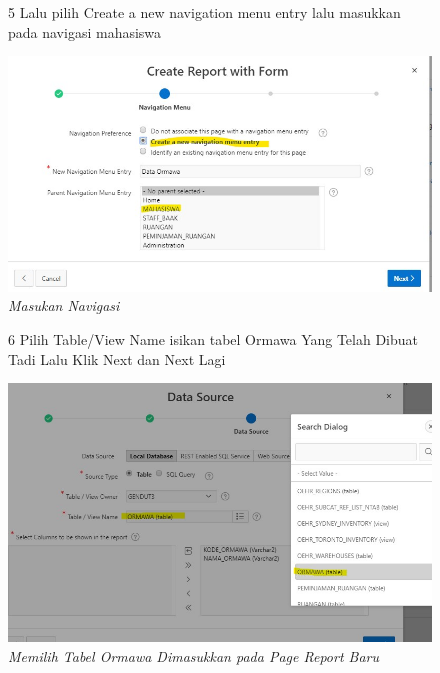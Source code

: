 \begin{itemize}
        \begin{figure}[!htbp]
        \item[5]Lalu pilih Create a new navigation menu entry lalu masukkan pada navigasi mahasiswa
        \begin{center}
        \includegraphics[scale=0.5]{figures/pilih_yang_ditandai.jpg}
        \caption{\textit{Masukan Navigasi}}
        \end{center}
        \end{figure}
        
        \begin{figure}[!htbp]
        \item[6]Pilih Table/View Name isikan tabel Ormawa Yang Telah Dibuat Tadi Lalu Klik Next dan Next Lagi
        \begin{center}
        \includegraphics[scale=0.47]{figures/pilih_tabel_ormawa_yg_sudah_dibuat.jpg}
        \caption{\textit{Memilih Tabel Ormawa Dimasukkan pada Page Report Baru}}
        \end{center}
        \end{figure}
        

\end{itemize}
